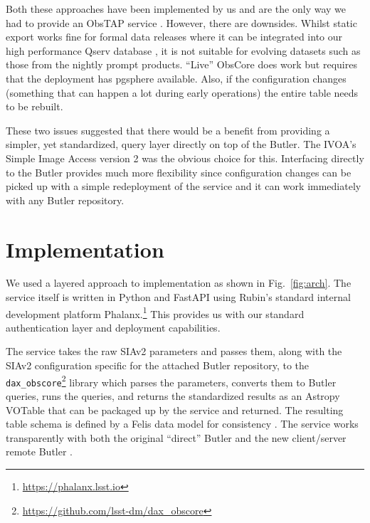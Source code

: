 \documentclass[11pt,twoside]{article}
\begin{document}
Both these approaches have been implemented by us and are the only way we had to provide an ObsTAP service \citep{2017ivoa.spec.0509L}.
However, there are downsides.
Whilst static export works fine for formal data releases where it can be integrated into our high performance Qserv database \citep{C15_adassxxxii}, it is not suitable for evolving datasets such as those from the nightly prompt products.
``Live'' ObsCore does work but requires that the deployment has pgsphere available.
Also, if the configuration changes (something that can happen a lot during early operations) the entire table needs to be rebuilt.

These two issues suggested that there would be a benefit from providing a simpler, yet standardized, query layer directly on top of the Butler.
The IVOA's Simple Image Access version 2 \citep[SIAv2;][]{2015ivoa.spec.1223D} was the obvious choice for this.
Interfacing directly to the Butler provides much more flexibility since configuration changes can be picked up with a simple redeployment of the service and it can work immediately with any Butler repository.

\section{Implementation}


We used a layered approach to implementation as shown in Fig.\ \ref{fig:arch}.
The service itself \citep{SQR-095} is written in Python and FastAPI using Rubin's standard internal development platform Phalanx.\footnote{\url{https://phalanx.lsst.io}}
This provides us with our standard authentication layer and deployment capabilities.

The service takes the raw SIAv2 parameters and passes them, along with the SIAv2 configuration specific for the attached Butler repository, to the \texttt{dax\_obscore}\footnote{\url{https://github.com/lsst-dm/dax_obscore}} library which parses the parameters, converts them to Butler queries, runs the queries, and returns the standardized results as an Astropy VOTable that can be packaged up by the service and returned.
The resulting table schema is defined by a Felis data model for consistency \citep{C702_adassxxxiv}.
The service works transparently with both the original ``direct'' Butler and the new client/server remote Butler \citep{2024SPIE13101E..3GJ}.
\end{document}
